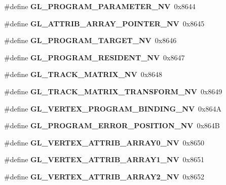 \begin{DoxyCompactItemize}
\item 
\#define {\bfseries G\+L\+\_\+\+P\+R\+O\+G\+R\+A\+M\+\_\+\+P\+A\+R\+A\+M\+E\+T\+E\+R\+\_\+\+N\+V}~0x8644\label{_s_d_l__opengl_8h_aedcf0fb64d7e003fde2ac0b00b82a0ef}

\item 
\#define {\bfseries G\+L\+\_\+\+A\+T\+T\+R\+I\+B\+\_\+\+A\+R\+R\+A\+Y\+\_\+\+P\+O\+I\+N\+T\+E\+R\+\_\+\+N\+V}~0x8645\label{_s_d_l__opengl_8h_a8048490b9efe0cda02983be461c6e541}

\item 
\#define {\bfseries G\+L\+\_\+\+P\+R\+O\+G\+R\+A\+M\+\_\+\+T\+A\+R\+G\+E\+T\+\_\+\+N\+V}~0x8646\label{_s_d_l__opengl_8h_a692077ea3ca1b0a1e3591dcd61a0a0f5}

\item 
\#define {\bfseries G\+L\+\_\+\+P\+R\+O\+G\+R\+A\+M\+\_\+\+R\+E\+S\+I\+D\+E\+N\+T\+\_\+\+N\+V}~0x8647\label{_s_d_l__opengl_8h_ae7ba31118fee490050fd3a973d4d7381}

\item 
\#define {\bfseries G\+L\+\_\+\+T\+R\+A\+C\+K\+\_\+\+M\+A\+T\+R\+I\+X\+\_\+\+N\+V}~0x8648\label{_s_d_l__opengl_8h_af71f788cfcc0dce60be49adc185e2ec5}

\item 
\#define {\bfseries G\+L\+\_\+\+T\+R\+A\+C\+K\+\_\+\+M\+A\+T\+R\+I\+X\+\_\+\+T\+R\+A\+N\+S\+F\+O\+R\+M\+\_\+\+N\+V}~0x8649\label{_s_d_l__opengl_8h_a1fcc09e8d6bb2014baf1235317f5ff35}

\item 
\#define {\bfseries G\+L\+\_\+\+V\+E\+R\+T\+E\+X\+\_\+\+P\+R\+O\+G\+R\+A\+M\+\_\+\+B\+I\+N\+D\+I\+N\+G\+\_\+\+N\+V}~0x864\+A\label{_s_d_l__opengl_8h_ad312df7c68c51acaebaa633380543efa}

\item 
\#define {\bfseries G\+L\+\_\+\+P\+R\+O\+G\+R\+A\+M\+\_\+\+E\+R\+R\+O\+R\+\_\+\+P\+O\+S\+I\+T\+I\+O\+N\+\_\+\+N\+V}~0x864\+B\label{_s_d_l__opengl_8h_a98b6ed8fdbe1eed03982ff06434bbc0b}

\item 
\#define {\bfseries G\+L\+\_\+\+V\+E\+R\+T\+E\+X\+\_\+\+A\+T\+T\+R\+I\+B\+\_\+\+A\+R\+R\+A\+Y0\+\_\+\+N\+V}~0x8650\label{_s_d_l__opengl_8h_a7524fd78ca0e3d53ff8b216ade1e577c}

\item 
\#define {\bfseries G\+L\+\_\+\+V\+E\+R\+T\+E\+X\+\_\+\+A\+T\+T\+R\+I\+B\+\_\+\+A\+R\+R\+A\+Y1\+\_\+\+N\+V}~0x8651\label{_s_d_l__opengl_8h_ab30c0e413eeaf257a55a0d20896acebc}

\item 
\#define {\bfseries G\+L\+\_\+\+V\+E\+R\+T\+E\+X\+\_\+\+A\+T\+T\+R\+I\+B\+\_\+\+A\+R\+R\+A\+Y2\+\_\+\+N\+V}~0x8652\label{_s_d_l__opengl_8h_a91441e9ba61425a6badc3cded00aca7e}


\end{DoxyCompactItemize}
